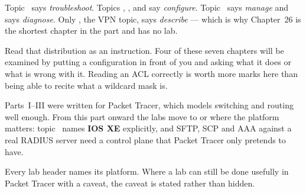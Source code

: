 \begin{examnote}
Topic~ says \emph{troubleshoot}. Topics , ,  and
 say \emph{configure}. Topic~ says \emph{manage} and  says
\emph{diagnose}. Only , the VPN topic, says \emph{describe} --- which is
why Chapter~26 is the shortest chapter in the part and has no lab.

Read that distribution as an instruction. Four of these seven chapters will be
examined by putting a configuration in front of you and asking what it does or
what is wrong with it. Reading an ACL correctly is worth more marks here than
being able to recite what a wildcard mask is.
\end{examnote}

\begin{conceptbox}
Parts~I--III were written for Packet Tracer, which models switching and routing
well enough. From this part onward the labs move to  or 
where the platform matters: topic~ names \textbf{IOS XE} explicitly, and
SFTP, SCP and AAA against a real RADIUS server need a control plane that Packet
Tracer only pretends to have.

Every lab header names its platform. Where a lab can still be done usefully in
Packet Tracer with a caveat, the caveat is stated rather than hidden.
\end{conceptbox}
